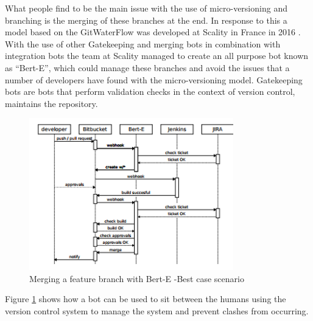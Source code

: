 \documentclass{scrartcl}
\begin{document}
{What people find to be the main issue with the use of micro-versioning and branching is the merging of these branches at the end. In response to this a model based on the GitWaterFlow was developed at Scality in France in 2016 \cite{GitWaterFlow}. With the use of other Gatekeeping and merging bots in combination with integration bots the team at Scality managed to create an all purpose bot known as ``Bert-E'', which could manage these branches and avoid the issues that a number of developers have found with the micro-versioning model. Gatekeeping bots are bots that perform validation checks in the context of version control, maintains the repository.
\begin{figure}[h!]
	\begin{center}
	\includegraphics [width=0.79\textwidth,inner]{BertE}
	\caption{Merging a feature branch with Bert-E -Best case scenario \cite{GitWaterFlow}}
	\label{BertE}
	\end{center}
\end{figure}

Figure \ref{BertE}  shows how a bot can be used to sit between the humans using the version control system to manage the system and prevent clashes from occurring.
}
\end{document}

